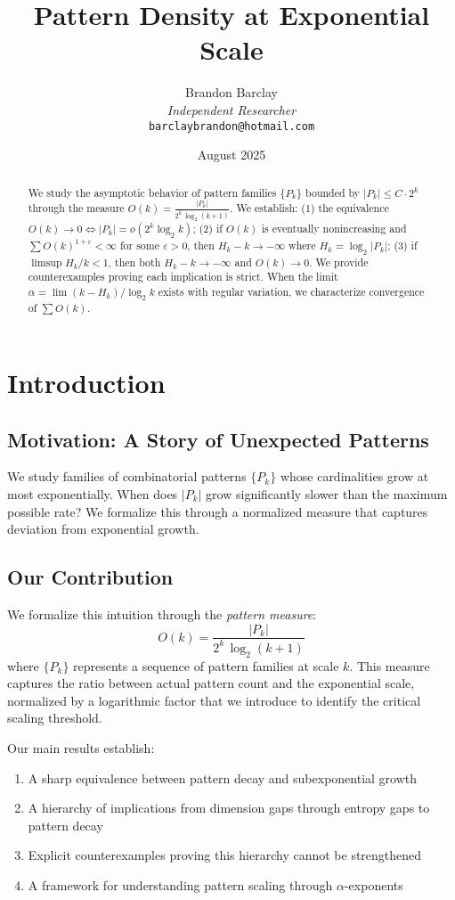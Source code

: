 \documentclass[11pt]{article}
\title{Pattern Density at Exponential Scale}
\author{Brandon Barclay\\
\textit{Independent Researcher}\\
\texttt{barclaybrandon@hotmail.com}}
\date{August 2025}
\theoremstyle{definition}
\newcommand{\eps}{\varepsilon}
\begin{document}
\maketitle

\begin{abstract}
We study the asymptotic behavior of pattern families $\{P_k\}$ bounded by $|P_k| \le C \cdot 2^k$ through the measure $O(k)=\frac{|P_k|}{2^k\,\log_2(k+1)}$. We establish: (1) the equivalence $O(k)\to 0 \iff |P_k|=o(2^k\log_2 k)$; (2) if $O(k)$ is eventually nonincreasing and $\sum O(k)^{1+\eps} < \infty$ for some $\eps > 0$, then $H_k-k\to-\infty$ where $H_k = \log_2|P_k|$; (3) if $\limsup H_k/k<1$, then both $H_k-k\to-\infty$ and $O(k)\to 0$. We provide counterexamples proving each implication is strict. When the limit $\alpha = \lim(k-H_k)/\log_2 k$ exists with regular variation, we characterize convergence of $\sum O(k)$.
\end{abstract}

\section{Introduction}

\subsection{Motivation: A Story of Unexpected Patterns}

We study families of combinatorial patterns $\{P_k\}$ whose cardinalities grow at most exponentially. When does $|P_k|$ grow significantly slower than the maximum possible rate? We formalize this through a normalized measure that captures deviation from exponential growth.

\subsection{Our Contribution}

We formalize this intuition through the \emph{pattern measure}:
$$O(k) = \frac{|P_k|}{2^k\,\log_2(k+1)}$$
where $\{P_k\}$ represents a sequence of pattern families at scale $k$. This measure captures the ratio between actual pattern count and the exponential scale, normalized by a logarithmic factor that we introduce to identify the critical scaling threshold.

Our main results establish:
\begin{enumerate}
\item A sharp equivalence between pattern decay and subexponential growth
\item A hierarchy of implications from dimension gaps through entropy gaps to pattern decay
\item Explicit counterexamples proving this hierarchy cannot be strengthened
\item A framework for understanding pattern scaling through $\alpha$-exponents
\end{enumerate}
\end{document}
